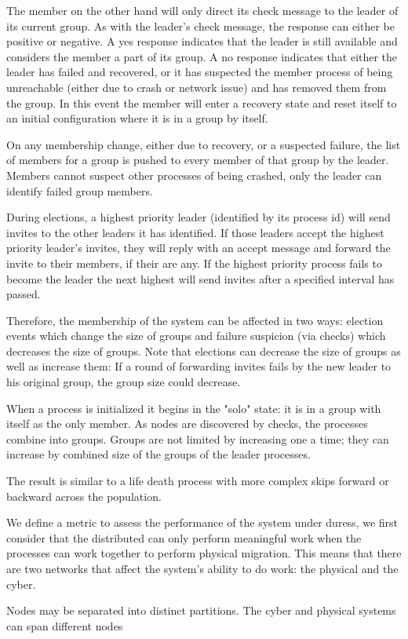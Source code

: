 The member on the other hand will only direct its check message to the leader 
of its current group. As with the leader's check message, the response can 
either be positive or negative. A yes response indicates that the leader is 
still available and considers the member a part of its group. A no response 
indicates that either the leader has failed and recovered, or it has suspected 
the member process of being unreachable (either due to crash or network issue) 
and has removed them from the group. In this event the member will enter a 
recovery state and reset itself to an initial configuration where it is in a 
group by itself.

On any membership change, either due to recovery, or a suspected failure, the 
list of members for a group is pushed to every member of that group by the 
leader. Members cannot suspect other processes of being crashed, only the 
leader can identify failed group members.

During elections, a highest priority leader (identified by its process id) will 
send invites to the other leaders it has identified. If those leaders accept 
the highest priority leader's invites, they will reply with an accept message 
and forward the invite to their members, if their are any. If the highest 
priority process fails to become the leader the next highest will send invites 
after a specified interval has passed.

Therefore, the membership of the system can be affected in two ways: election 
events which change the size of groups and failure suspicion (via checks) which 
decreases the size of groups. Note that elections can decrease the size of 
groups as well as increase them: If a round of forwarding invites fails by the 
new leader to his original group, the group size could decrease.

When a process is initialized it begins in the "solo" state: it is in a group 
with itself as the only member. As nodes are discovered by checks, the 
processes combine into groups. Groups are not limited by increasing one a time; 
they can increase by combined size of the groups of the leader processes.

The result is similar to a life death process with more complex skips forward 
or backward across the population.

We define a metric to assess the performance of the system under duress, we 
first consider that the distributed can only perform meaningful work when the 
processes can work together to perform physical migration. This means that 
there are two networks that affect the system's ability to do work: the 
physical and the cyber.

Nodes may be separated into distinct partitions. The cyber and physical systems 
can span different nodes 
